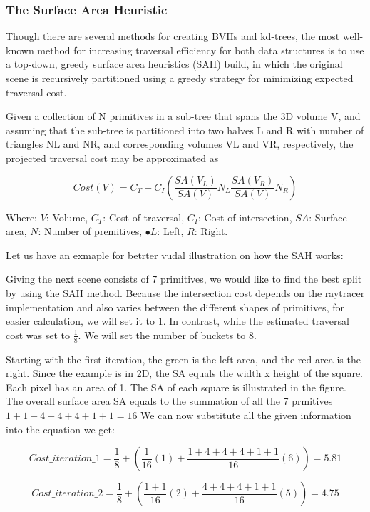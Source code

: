 \documentclass[11pt,a4paper]{article}
\begin{document}
\subsubsection{The Surface Area Heuristic}
Though there are several methods for creating BVHs and kd-trees, the most well-known method for increasing traversal efficiency for both data structures is to use a top-down, greedy surface area heuristics (SAH) build, in which the original scene is recursively partitioned using a greedy strategy for minimizing expected traversal cost. 

Given a collection of N primitives in a sub-tree that spans the 3D volume V, and assuming that the sub-tree is partitioned into two halves L and R with number of triangles NL and NR, and corresponding volumes VL and VR, respectively, the projected traversal cost may be approximated as

\begin{equation}
Cost(V) = C_T + C_I(\frac{SA(V_L)}{SA(V)}N_L \frac{SA(V_R)}{SA(V)}N_R)
\end{equation}

Where: $V$: Volume, $C_T$: Cost of traversal, $C_I$: Cost of intersection, $SA$: Surface area, $N$: Number of premitives, $•L$: Left, $R$: Right.


Let us have an exmaple for betrter vudal illustration on how the SAH works: 

Giving the next scene consists of 7 primitives, we would like to find the best split by using the SAH method. Because the intersection cost depends on the raytracer implementation and also varies between the different shapes of primitives, for easier calculation, we will set it to 1. In contrast, while the estimated traversal cost was set to $\frac{1}{8}$. We will set the number of buckets to 8.

Starting with the first iteration, the green is the left area, and the red area is the right. Since the example is in 2D, the SA equals the width x height of the square. Each pixel has an area of 1. The SA of each square is illustrated in the figure. The overall surface area SA equals to the summation of all the 7 prmitives $1+1+4+4+4+1+1 = 16$ We can now substitute all the given information into the equation we get: 


\begin{equation}
Cost\_iteration\_1 =  \frac{1}{8} + (\frac{1}{16}(1) +\frac{1+4+4+4+1+1}{16}(6)) = 5.81
\end{equation}

\begin{equation}
Cost\_iteration\_2 =  \frac{1}{8} + (\frac{1+1}{16}(2) +\frac{4+4+4+1+1}{16}(5)) = 4.75
\end{equation}
\end{document}
